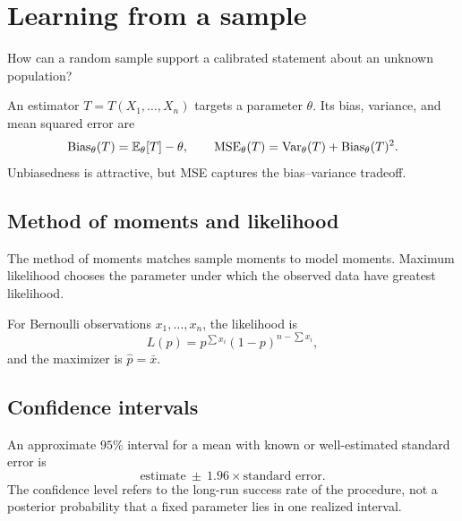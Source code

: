 \chapter{Learning from a sample}

\begin{question}
How can a random sample support a calibrated statement about an unknown population?
\end{question}

An estimator $T=T(X_1,\ldots,X_n)$ targets a parameter $\theta$. Its bias, variance, and mean squared error are
\[
\operatorname{Bias}_\theta(T)=\mathbb E_\theta[T]-\theta,
\qquad
\operatorname{MSE}_\theta(T)=\operatorname{Var}_\theta(T)+\operatorname{Bias}_\theta(T)^2.
\]
Unbiasedness is attractive, but MSE captures the bias--variance tradeoff.

\section{Method of moments and likelihood}

The method of moments matches sample moments to model moments. Maximum likelihood chooses the parameter under which the observed data have greatest likelihood.

For Bernoulli observations $x_1,\ldots,x_n$, the likelihood is
\[
L(p)=p^{\sum x_i}(1-p)^{n-\sum x_i},
\]
and the maximizer is $\hat p=\bar x$.

\section{Confidence intervals}

An approximate $95\%$ interval for a mean with known or well-estimated standard error is
\[
\text{estimate}\ \pm\ 1.96\times\text{standard error}.
\]
The confidence level refers to the long-run success rate of the procedure, not a posterior probability that a fixed parameter lies in one realized interval.

\begin{center}
\end{center}

